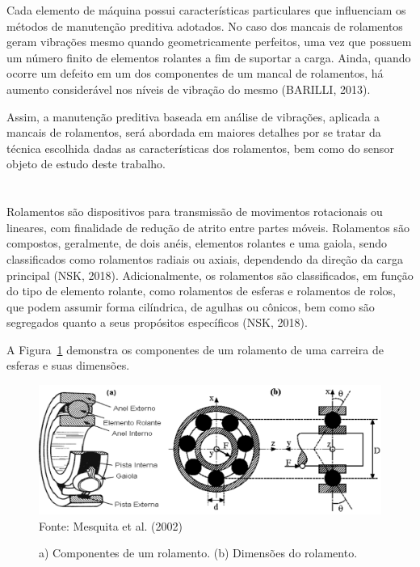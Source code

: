 \documentclass[
	12pt,				
	oneside,			
	a4paper,			
	english,			
	brazil,			
	]{abntex2ppgsi}
\begin{document}
Cada elemento de máquina possui características particulares que influenciam os métodos de manutenção preditiva adotados. No caso dos mancais de rolamentos geram vibrações mesmo quando geometricamente perfeitos, uma vez que possuem um número finito de elementos rolantes a fim de suportar a carga. Ainda, quando ocorre um defeito em um dos componentes de um mancal de rolamentos, há aumento considerável nos níveis de vibração do mesmo (BARILLI, 2013).

Assim, a manutenção preditiva baseada em análise de vibrações, aplicada a mancais de rolamentos, será abordada em maiores detalhes por se tratar da técnica escolhida dadas as características dos rolamentos, bem como do sensor objeto de estudo deste trabalho.



\newpage
\section{}
Rolamentos são dispositivos para transmissão de movimentos rotacionais ou lineares, com finalidade de redução de atrito entre partes móveis. Rolamentos são compostos, geralmente, de dois anéis, elementos rolantes e uma gaiola, sendo classificados como rolamentos radiais ou axiais, dependendo da direção da carga principal (NSK, 2018). Adicionalmente, os rolamentos são classificados, em função do tipo de elemento rolante, como rolamentos de esferas e rolamentos de rolos, que podem assumir forma cilíndrica, de agulhas ou cônicos, bem como são segregados quanto a seus propósitos específicos (NSK, 2018).

A Figura~\ref{ComponentesRolamentos} demonstra os componentes de um rolamento de uma carreira de esferas e suas dimensões. 

\begin{figure}[!htb]
\centering
\caption{a) Componentes de um rolamento. (b) Dimensões do rolamento.}
\includegraphics[width=\textwidth,height=\textheight,keepaspectratio]{Figura1} \\
Fonte: Mesquita et al. (2002)
\label{ComponentesRolamentos}
\end{figure}
\end{document}
